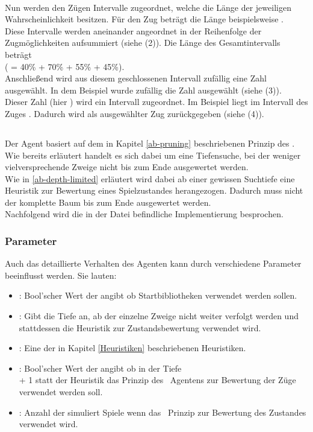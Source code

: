 \\Nun werden den Zügen Intervalle zugeordnet, welche die Länge der jeweiligen Wahrscheinlichkeit besitzen. Für den Zug  beträgt die Länge beispielsweise . 
\\Diese Intervalle werden aneinander angeordnet in der Reihenfolge der Zugmöglichkeiten aufsummiert (siehe (2)). Die Länge des Gesamtintervalls beträgt  \\( = 40\% + 70\% + 55\% + 45\%).
\\Anschließend wird aus diesem geschlossenen Intervall zufällig eine Zahl ausgewählt. In dem Beispiel wurde zufällig die Zahl  ausgewählt (siehe (3)). 
\\Dieser Zahl (hier ) wird ein Intervall zugeordnet. Im Beispiel liegt  im Intervall des Zuges . Dadurch wird  als ausgewählter Zug zurückgegeben (siehe (4)).


\subsection{\abp}
Der Agent \mxZitat{\abp} basiert auf dem in Kapitel \ref{ab-pruning} beschriebenen Prinzip des \ababs. Wie bereits erläutert handelt es sich dabei um eine Tiefensuche, bei der weniger vielversprechende Zweige nicht bis zum Ende ausgewertet werden.
\\Wie in \ref{ab-depth-limited} erläutert wird dabei ab einer gewissen Suchtiefe eine Heuristik zur Bewertung eines Spielzustandes herangezogen. Dadurch muss nicht der komplette Baum bis zum Ende ausgewertet werden.  
\\Nachfolgend wird die in der Datei  befindliche Implementierung besprochen.
\subsubsection{Parameter}
Auch das detaillierte Verhalten des Agenten \mxZitat{\abp} kann durch verschiedene Parameter beeinflusst werden. Sie lauten:
\begin{itemize}
\item {}: Bool'scher Wert der angibt ob Startbibliotheken verwendet werden sollen.
\item {}: Gibt die Tiefe an, ab der einzelne Zweige nicht weiter verfolgt werden und stattdessen die Heuristik zur Zustandsbewertung verwendet wird.
\item {}: Eine der in Kapitel \ref{Heuristiken} beschriebenen Heuristiken.
\item {}: Bool'scher Wert der angibt ob in der Tiefe \\ + 1 statt der Heuristik das Prinzip des \mc\ Agentens zur Bewertung der Züge verwendet werden soll.
\item {}: Anzahl der simuliert Spiele wenn das \mc\ Prinzip zur Bewertung des Zustandes verwendet wird.
\end{itemize}
